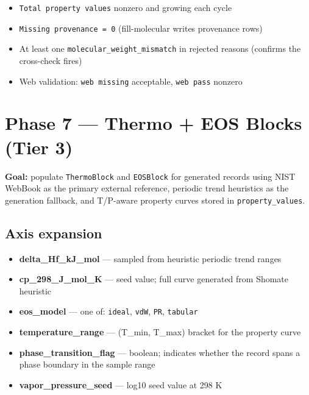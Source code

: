 \documentclass[11pt, a4paper]{article}
\begin{document}
\begin{itemize}[leftmargin=*, itemsep=2pt]
  \item \texttt{Total property values} nonzero and growing each cycle
  \item \texttt{Missing provenance = 0} (fill-molecular writes provenance rows)
  \item At least one \texttt{molecular\_weight\_mismatch} in rejected reasons
		(confirms the cross-check fires)
  \item Web validation: \texttt{web missing} acceptable, \texttt{web pass} nonzero
\end{itemize}

\section{Phase 7 --- Thermo + EOS Blocks (Tier 3)}

\begin{tierbox}
\textbf{Goal:} populate \texttt{ThermoBlock} and \texttt{EOSBlock} for generated records
using NIST WebBook as the primary external reference, periodic trend heuristics
as the generation fallback, and T/P-aware property curves stored in
\texttt{property\_values}.
\end{tierbox}

\subsection{Axis expansion}

\begin{itemize}[leftmargin=*, itemsep=2pt]
  \item \textbf{delta\_Hf\_kJ\_mol} --- sampled from heuristic periodic trend ranges
  \item \textbf{cp\_298\_J\_mol\_K} --- seed value; full curve generated from Shomate heuristic
  \item \textbf{eos\_model} --- one of: \texttt{ideal}, \texttt{vdW}, \texttt{PR}, \texttt{tabular}
  \item \textbf{temperature\_range} --- (T\_min, T\_max) bracket for the property curve
  \item \textbf{phase\_transition\_flag} --- boolean; indicates whether the record spans a
		phase boundary in the sample range
  \item \textbf{vapor\_pressure\_seed} --- log10 seed value at 298 K
\end{itemize}
\end{document}
